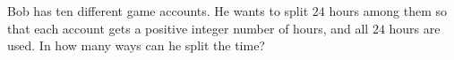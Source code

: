 Bob has ten different game accounts. He wants to split $24$ hours among them so that each account gets a positive integer number of hours, and all $24$ hours are used. In how many ways can he split the time?
